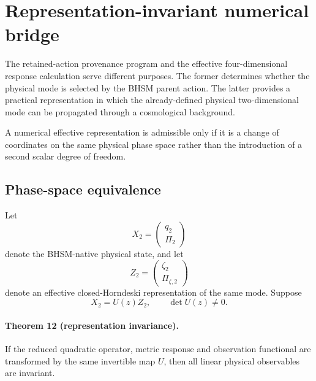 \section{Representation-invariant numerical bridge}
\label{sec:representation-invariant-bridge}

The retained-action provenance program and the effective four-dimensional
response calculation serve different purposes.  The former determines
whether the physical mode is selected by the BHSM parent action.  The latter
provides a practical representation in which the already-defined physical
two-dimensional mode can be propagated through a cosmological background.

A numerical effective representation is admissible only if it is a change of
coordinates on the same physical phase space rather than the introduction of
a second scalar degree of freedom.

\subsection{Phase-space equivalence}

Let
\begin{equation}
X_2
=
\begin{pmatrix}
q_2\\
\Pi_2
\end{pmatrix}
\end{equation}
denote the BHSM-native physical state, and let
\begin{equation}
Z_2
=
\begin{pmatrix}
\zeta_2\\
\Pi_{\zeta,2}
\end{pmatrix}
\end{equation}
denote an effective closed-Horndeski representation of the same mode.
Suppose
\begin{equation}
\boxed{
X_2=U(z)Z_2,
\qquad
\det U(z)\ne0.
}
\label{eq:XUZ}
\end{equation}

\paragraph{Theorem 12 (representation invariance).}
If the reduced quadratic operator, metric response and observation functional
are transformed by the same invertible map $U$, then all linear physical
observables are invariant.

